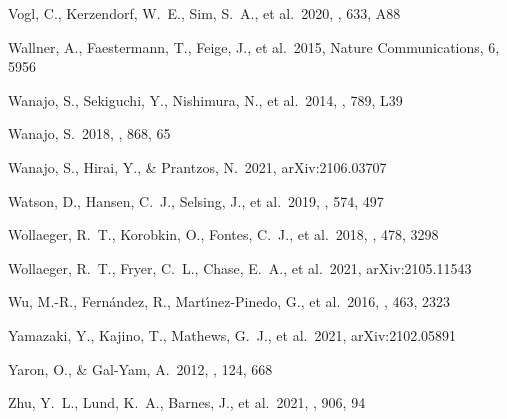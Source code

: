 \documentclass[twocolumn, twocolappendix]{aastex63}
\begin{document}
\begin{thebibliography}{}
 Vogl, C., Kerzendorf, W.~E., Sim, S.~A., et al.\ 2020, \aap, 633, A88


 Wallner, A., Faestermann, T., Feige, J., et al.\ 2015, Nature Communications, 6, 5956


 Wanajo, S., Sekiguchi, Y., Nishimura, N., et al.\ 2014, \apjl, 789, L39


 Wanajo, S.\ 2018, \apj, 868, 65


 Wanajo, S., Hirai, Y., \& Prantzos, N.\ 2021, arXiv:2106.03707




 Watson, D., Hansen, C.~J., Selsing, J., et al.\ 2019, \nat, 574, 497


 Wollaeger, R.~T., Korobkin, O., Fontes, C.~J., et al.\ 2018, \mnras, 478, 3298


 Wollaeger, R.~T., Fryer, C.~L., Chase, E.~A., et al.\ 2021, arXiv:2105.11543


 Wu, M.-R., Fern{\'a}ndez, R., Mart{\'\i}nez-Pinedo, G., et al.\ 2016, \mnras, 463, 2323




 Yamazaki, Y., Kajino, T., Mathews, G.~J., et al.\ 2021, arXiv:2102.05891


 Yaron, O., \& Gal-Yam, A.\ 2012, \pasp, 124, 668




 Zhu, Y.~L., Lund, K.~A., Barnes, J., et al.\ 2021, \apj, 906, 94


\end{thebibliography}


\appendix{}

\end{document}
